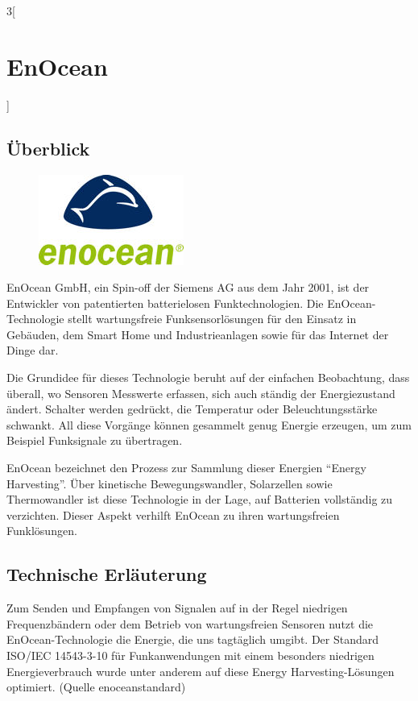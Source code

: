 \begin{multicols}{3}[\section{EnOcean}]
\subsection*{Überblick}
\begin{figure}
  \vspace{-20pt}
  \begin{center}
  	\hspace{-20pt}
    \includegraphics[width=1\linewidth]{Kapitel/EnOcean/Grafiken/Eno_alliance_ing_logo_180.jpg}
  \end{center}
  \vspace{-15pt}
\end{figure}
EnOcean GmbH, ein Spin-off der Siemens AG aus dem Jahr 2001, ist der Entwickler von patentierten batterielosen Funktechnologien. Die EnOcean-Technologie stellt wartungsfreie Funksensorlösungen für den Einsatz in Gebäuden, dem Smart Home und Industrieanlagen sowie für das Internet der Dinge dar.

Die Grundidee für dieses Technologie beruht auf der einfachen Beobachtung, dass überall, wo Sensoren Messwerte erfassen, sich auch ständig der Energiezustand ändert. Schalter werden gedrückt, die Temperatur oder Beleuchtungsstärke schwankt. All diese Vorgänge können gesammelt genug Energie erzeugen, um zum Beispiel Funksignale zu übertragen.

EnOcean bezeichnet den Prozess zur Sammlung dieser Energien \enquote{Energy Harvesting}. Über kinetische Bewegungswandler, Solarzellen sowie Thermowandler ist diese Technologie in der Lage, auf Batterien vollständig zu verzichten. Dieser Aspekt verhilft EnOcean zu ihren wartungsfreien Funklösungen.

\subsection*{Technische Erläuterung}
Zum Senden und Empfangen von Signalen auf in der Regel niedrigen Frequenzbändern oder dem Betrieb von wartungsfreien Sensoren nutzt die EnOcean-Technologie die Energie, die uns tagtäglich umgibt. Der Standard ISO/IEC 14543-3-10 für Funkanwendungen mit einem besonders niedrigen Energieverbrauch wurde unter anderem auf diese Energy Harvesting-Lösungen optimiert. (Quelle enoceanstandard) 


\end{multicols}
